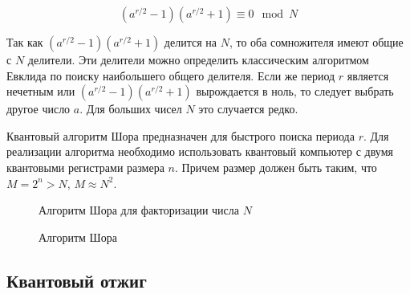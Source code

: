 \documentclass[12pt]{article}
\begin{document}
\[
(a^{r/2} - 1)(a^{r/2} + 1) \equiv 0 \mod N
\]

Так как \((a^{r/2} - 1)(a^{r/2} + 1)\) делится на \( N \), то оба сомножителя имеют общие с \( N \) делители. Эти делители можно определить классическим алгоритмом Евклида по поиску наибольшего общего делителя. Если же период \( r \) является нечетным или \((a^{r/2} - 1)(a^{r/2} + 1)\) вырождается в ноль, то следует выбрать другое число \( a \). Для больших чисел \( N \) это случается редко.

Квантовый алгоритм Шора предназначен для быстрого поиска периода \( r \). Для реализации алгоритма необходимо использовать квантовый компьютер с двумя квантовыми регистрами размера \( n \). Причем размер должен быть таким, что \( M = 2^n > N \), \( M \approx N^2 \).

\begin{figure}[h]
    \centering
    \begin{algorithm}[H]
    \caption{Алгоритм Шора для факторизации числа \( N \)}
     
    \end{algorithm}
    \caption{Алгоритм Шора}
    \label{fig:post-mechs}
\end{figure}

\newpage

\subsection{Квантовый отжиг}
\end{document}
